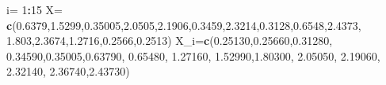 \documentclass[a4paper,oneside,openany]{book}
\newenvironment{Shaded}{\begin{snugshade}}{\end{snugshade}}
\newcommand{\KeywordTok}[1]{\textcolor[rgb]{0.13,0.29,0.53}{\textbf{#1}}}
\newcommand{\DecValTok}[1]{\textcolor[rgb]{0.00,0.00,0.81}{#1}}
\newcommand{\FloatTok}[1]{\textcolor[rgb]{0.00,0.00,0.81}{#1}}
\newcommand{\StringTok}[1]{\textcolor[rgb]{0.31,0.60,0.02}{#1}}
\newcommand{\OperatorTok}[1]{\textcolor[rgb]{0.81,0.36,0.00}{\textbf{#1}}}
\newcommand{\NormalTok}[1]{#1}
\begin{document}
\begin{Shaded}
\begin{Highlighting}[]
\NormalTok{i=}\StringTok{ }\DecValTok{1}\OperatorTok{:}\DecValTok{15}
\NormalTok{X=}\StringTok{ }\KeywordTok{c}\NormalTok{(}\FloatTok{0.6379}\NormalTok{,}\FloatTok{1.5299}\NormalTok{,}\FloatTok{0.35005}\NormalTok{,}\FloatTok{2.0505}\NormalTok{,}\FloatTok{2.1906}\NormalTok{,}\FloatTok{0.3459}\NormalTok{,}\FloatTok{2.3214}\NormalTok{,}\FloatTok{0.3128}\NormalTok{,}\FloatTok{0.6548}\NormalTok{,}\FloatTok{2.4373}\NormalTok{,}
               \FloatTok{1.803}\NormalTok{,}\FloatTok{2.3674}\NormalTok{,}\FloatTok{1.2716}\NormalTok{,}\FloatTok{0.2566}\NormalTok{,}\FloatTok{0.2513}\NormalTok{)}
\NormalTok{X_i=}\KeywordTok{c}\NormalTok{(}\FloatTok{0.25130}\NormalTok{,}\FloatTok{0.25660}\NormalTok{,}\FloatTok{0.31280}\NormalTok{, }\FloatTok{0.34590}\NormalTok{,}\FloatTok{0.35005}\NormalTok{,}\FloatTok{0.63790}\NormalTok{, }\FloatTok{0.65480}\NormalTok{, }\FloatTok{1.27160}\NormalTok{, }
               \FloatTok{1.52990}\NormalTok{,}\FloatTok{1.80300}\NormalTok{, }\FloatTok{2.05050}\NormalTok{, }\FloatTok{2.19060}\NormalTok{, }\FloatTok{2.32140}\NormalTok{, }\FloatTok{2.36740}\NormalTok{,}\FloatTok{2.43730}\NormalTok{)}


\end{Highlighting}
\end{Shaded}
\end{document}

